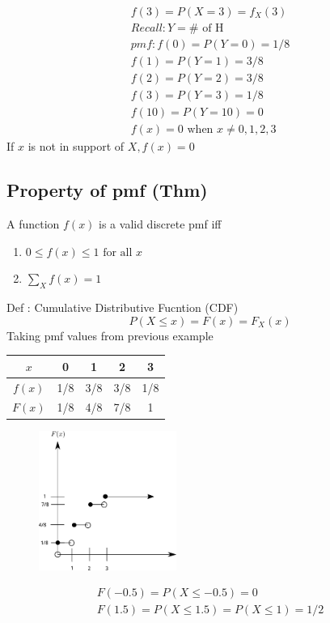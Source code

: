 \begin{align*}
     f(3) = P(X = 3) = f_X (3) \\
     Recall : Y = \# \text{ of H} \\
     pmf : f(0) = P(Y = 0) = 1/8 \\
     f(1) = P(Y = 1) = 3/8 \\
     f(2) = P(Y = 2) = 3/8 \\
     f(3) = P(Y = 3) = 1/8 \\
     f(10) = P(Y = 10) = 0 \\
     f(x) = 0 \text{ when } x \not= 0, 1, 2, 3
\end{align*}
If $x$ is not in support of $X, f(x) = 0$

\subsection*{Property of pmf (Thm)}
A function $f(x)$ is a valid discrete pmf iff
    \begin{enumerate}
	\item $0 \le f(x) \le 1 \text{ for all } x$ 
	\item $\sum\limits_{X} f(x) = 1$
    \end{enumerate}

    Def : Cumulative Distributive Fucntion (CDF)
    \[
	P(X \le x) = F(x) = F_X (x)
    \]
    Taking pmf values from previous example
    \begin{table}[H]
        \centering
        \label{tab:cdf}
        \begin{tabular}{c|cccc}
	    $x$ & 0 & 1 & 2 & 3 \\
	    \hline
	    $f(x)$ & 1/8 & 3/8 & 3/8 & 1/8 \\
	    $F(x)$ & 1/8 & 4/8 & 7/8 & 1
        \end{tabular}
    \end{table}
    \begin{figure}[H]
        \centering
        \includegraphics[width=0.4\textwidth]{./figs/cdf}
        \label{fig:s-cdf}
    \end{figure}
    \begin{align*}
	F(-0.5) = P(X \le -0.5) = 0 \\
	F(1.5) = P(X \le 1.5) = P(X \le 1) = 1/2
    \end{align*}

